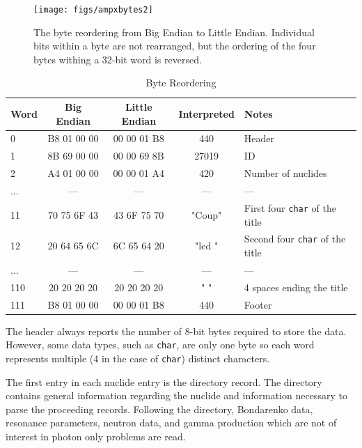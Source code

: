 \begin{figure}[tb]
  \begin{center}
   \texttt{[image: figs/ampxbytes2]}
  \end{center}
  \caption{The byte reordering from Big Endian to Little Endian. Individual bits within a byte are not rearranged, but the ordering of the four bytes withing a 32-bit word is reversed.}
\label{fig:ampxbytes2}
\end{figure}

\begin{table}[ht]
\caption{Byte Reordering}
\centering 
\begin{tabular}{l | c | c | c | l}
  \hline \hline   
  Word  & Big Endian & Little Endian & Interpreted & Notes\\ [0.5ex] %
  \hline
  0   & B8 01 00 00 & 00 00 01 B8 & 440    & Header                    \\
  1   & 8B 69 00 00 & 00 00 69 8B & 27019  & ID                        \\
  2   & A4 01 00 00 & 00 00 01 A4 & 420    & Number of nuclides        \\
  ... &      ---    &      ---    &    --- & ---                       \\
  11  & 70 75 6F 43 & 43 6F 75 70 & "Coup" & First four \texttt{char} of the title   \\
  12  & 20 64 65 6C & 6C 65 64 20 & "led " & Second four \texttt{char} of the title  \\
  ... &     ---     &    ---      &  ---   & ---                       \\
  110 & 20 20 20 20 & 20 20 20 20 & "    " & 4 spaces ending the title \\
  111 & B8 01 00 00 & 00 00 01 B8 & 440    & Footer                    \\ 
  [1ex]      %
  \hline
\end{tabular}
\label{tab:reorder}
\end{table}

The header always reports the number of 8-bit bytes required to store the data. However, some data types, such as \texttt{char}, are only one byte so each word represents multiple (4 in the case of \texttt{char}) distinct characters.


The first entry in each nuclide entry is the directory record. The directory contains general information regarding the nuclide and information necessary to parse the proceeding records. Following the directory, Bondarenko data, resonance parameters, neutron data, and gamma production which are not of interest in photon only problems are read.

